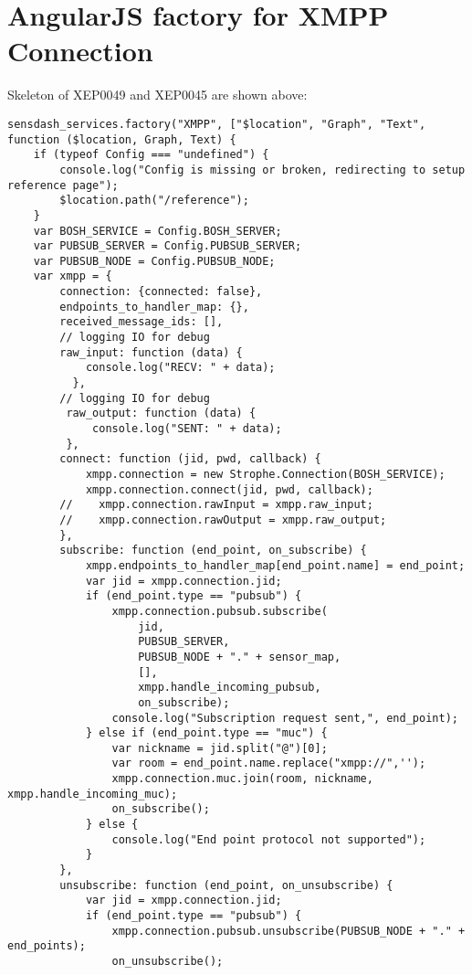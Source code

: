\chapter{AngularJS factory for XMPP Connection}
Skeleton of XEP0049 and XEP0045 are shown above:
\begin{lstlisting}
sensdash_services.factory("XMPP", ["$location", "Graph", "Text", function ($location, Graph, Text) {
    if (typeof Config === "undefined") {
        console.log("Config is missing or broken, redirecting to setup reference page");
        $location.path("/reference");
    }
    var BOSH_SERVICE = Config.BOSH_SERVER;
    var PUBSUB_SERVER = Config.PUBSUB_SERVER;
    var PUBSUB_NODE = Config.PUBSUB_NODE;
    var xmpp = {
        connection: {connected: false},
        endpoints_to_handler_map: {},
        received_message_ids: [],
        // logging IO for debug
        raw_input: function (data) {
            console.log("RECV: " + data);
          },
        // logging IO for debug
         raw_output: function (data) {
             console.log("SENT: " + data);
         },
        connect: function (jid, pwd, callback) {
            xmpp.connection = new Strophe.Connection(BOSH_SERVICE);
            xmpp.connection.connect(jid, pwd, callback);
        //    xmpp.connection.rawInput = xmpp.raw_input;
        //    xmpp.connection.rawOutput = xmpp.raw_output;
        },
        subscribe: function (end_point, on_subscribe) {
            xmpp.endpoints_to_handler_map[end_point.name] = end_point;
            var jid = xmpp.connection.jid;
            if (end_point.type == "pubsub") {
                xmpp.connection.pubsub.subscribe(
                    jid,
                    PUBSUB_SERVER,
                    PUBSUB_NODE + "." + sensor_map,
                    [],
                    xmpp.handle_incoming_pubsub,
                    on_subscribe);
                console.log("Subscription request sent,", end_point);
            } else if (end_point.type == "muc") {
                var nickname = jid.split("@")[0];
                var room = end_point.name.replace("xmpp://",'');
                xmpp.connection.muc.join(room, nickname, xmpp.handle_incoming_muc);
                on_subscribe();
            } else {
                console.log("End point protocol not supported");
            }
        },
        unsubscribe: function (end_point, on_unsubscribe) {
            var jid = xmpp.connection.jid;
            if (end_point.type == "pubsub") {
                xmpp.connection.pubsub.unsubscribe(PUBSUB_NODE + "." + end_points);
                on_unsubscribe();

\end{lstlisting}
